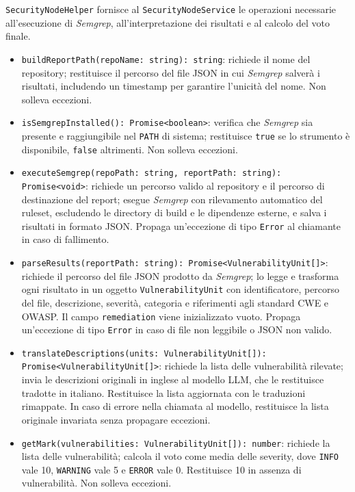 \documentclass[a4paper, 11pt]{article}
\newcounter{subsubsubsection}[subsubsection]
\begin{document}
\texttt{SecurityNodeHelper} fornisce al \texttt{SecurityNodeService} le operazioni
necessarie all'esecuzione di \textit{Semgrep}, all'interpretazione dei risultati e al
calcolo del voto finale.
\begin{itemize}
  \item \texttt{buildReportPath(repoName: string): string}:
  richiede il nome del repository; restituisce il percorso del file JSON in cui
  \textit{Semgrep} salverà i risultati, includendo un timestamp per garantire l'unicità
  del nome. Non solleva eccezioni.
 
  \item \texttt{isSemgrepInstalled(): Promise<boolean>}:
  verifica che \textit{Semgrep} sia presente e raggiungibile nel \texttt{PATH} di sistema;
  restituisce \texttt{true} se lo strumento è disponibile, \texttt{false} altrimenti.
  Non solleva eccezioni.
 
  \item \texttt{executeSemgrep(repoPath: string, reportPath: string): Promise<void>}:
  richiede un percorso valido al repository e il percorso di destinazione del report;
  esegue \textit{Semgrep} con rilevamento automatico del ruleset, escludendo le directory
  di build e le dipendenze esterne, e salva i risultati in formato JSON. Propaga
  un'eccezione di tipo \texttt{Error} al chiamante in caso di fallimento.
 
  \item \texttt{parseResults(reportPath: string): Promise<VulnerabilityUnit[]>}:
  richiede il percorso del file JSON prodotto da \textit{Semgrep}; lo legge e trasforma
  ogni risultato in un oggetto \texttt{VulnerabilityUnit} con identificatore, percorso
  del file, descrizione, severità, categoria e riferimenti agli standard CWE e OWASP.
  Il campo \texttt{remediation} viene inizializzato vuoto. Propaga un'eccezione di tipo
  \texttt{Error} in caso di file non leggibile o JSON non valido.
 
  \item \texttt{translateDescriptions(units: VulnerabilityUnit[]): Promise<VulnerabilityUnit[]>}:
  richiede la lista delle vulnerabilità rilevate; invia le descrizioni originali in inglese
  al modello LLM, che le restituisce tradotte in italiano. Restituisce la lista aggiornata
  con le traduzioni rimappate. In caso di errore nella chiamata al modello, restituisce la
  lista originale invariata senza propagare eccezioni.
 
  \item \texttt{getMark(vulnerabilities: VulnerabilityUnit[]): number}:
  richiede la lista delle vulnerabilità; calcola il voto come media delle severity, dove
  \texttt{INFO} vale 10, \texttt{WARNING} vale 5 e \texttt{ERROR} vale 0. Restituisce 10
  in assenza di vulnerabilità. Non solleva eccezioni.
\end{itemize}
\end{document}
